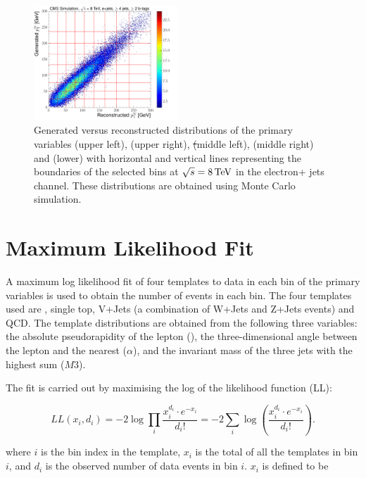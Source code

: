 \begin{figure}[hbtp]
	 \includegraphics[width=0.48\textwidth]{Chapters/04_Analysis/04b_XSections/images/binning/electron_WPT_8TeV.pdf}\hfill
	 \caption{Generated versus reconstructed distributions of the primary variables \met (upper left), \HT (upper
	 right), \st (middle left), \mt (middle right) and \wpt (lower) with horizontal and vertical lines
	 representing the boundaries of the selected bins at $\sqrt{s}=8\,\text{Te\hspace{-.08em}V}$ in the electron+ jets channel. These
	 distributions are obtained using \ttbar Monte Carlo simulation.}
     \label{fig:binning_8TeV_electron}
 \end{figure}
\FloatBarrier

\section{Maximum Likelihood Fit}
\label{s:maximum_likelihood_fit}
A maximum log likelihood fit of four templates to data in each bin of the primary variables is used to obtain
the number of events in each bin. The four templates used are \ttbar, single top, V+Jets (a combination of
W+Jets and Z+Jets events) and QCD. The template distributions are obtained from the following three
variables: the absolute pseudorapidity of the lepton (\abseta), the three-dimensional angle between the lepton
and the nearest \bjet ($\alpha$), and the invariant mass of the three jets with the highest \pt sum ($M3$).

The fit is carried out by maximising the log of the likelihood function (LL):

\begin{equation}
\label{log_likelihood}
LL\left(x_i, d_i\right) = -2 \log{\prod\limits_{i}\frac{x_i^{d_i}\cdot
e^{-x_i}}{d_i!}}=-2\sum\limits_{i}\log{\left(\frac{x_i^{d_i}\cdot e^{-x_i}}{d_i!}\right)}.
\end{equation}

where $i$ is the bin index in the template, $x_i$ is the total of all the templates in bin $i$, and $d_i$ is
the observed number of data events in  bin $i$. $x_i$ is defined to be

